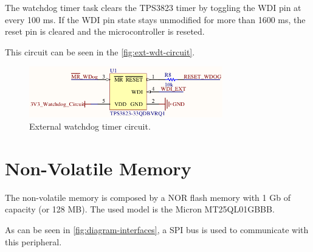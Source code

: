 The watchdog timer task clears the TPS3823 timer by toggling the WDI pin at every 100 ms. If the WDI pin state stays unmodified for more than 1600 ms, the reset pin is cleared and the microcontroller is reseted.

This circuit can be seen in the \autoref{fig:ext-wdt-circuit}.

\begin{figure}[!ht]
    \begin{center}
        \includegraphics[width=0.75\textwidth]{figures/ext-watchdog-circuit.png}
        \caption{External watchdog timer circuit.}
        \label{fig:ext-wdt-circuit}
    \end{center}
\end{figure}

\section{Non-Volatile Memory}

The non-volatile memory is composed by a NOR flash memory with 1 Gb of capacity (or 128 MB). The used model is the Micron MT25QL01GBBB.

As can be seen in \autoref{fig:diagram-interfaces}, a SPI bus is used to communicate with this peripheral.
